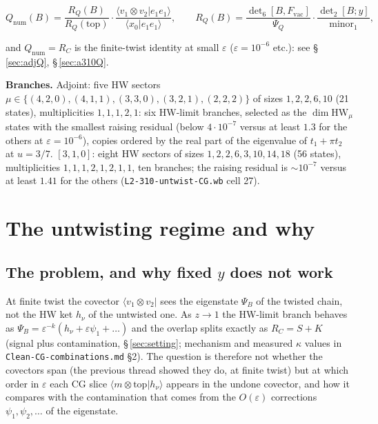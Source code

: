 \documentclass[10pt]{article}
\newcommand{\nb}[1]{\texttt{#1}}
\begin{document}
\[
Q_{\mathrm{num}}(B)=\frac{R_Q(B)}{R_Q(\mathrm{top})}\cdot\frac{\langle v_1\otimes v_2|e_1e_1\rangle}{\langle x_0|e_1e_1\rangle},\qquad R_Q(B)=\frac{\det\nolimits_6[B,F_{\mathrm{vac}}]}{\Psi_Q}\cdot\frac{\det\nolimits_2[B;y]}{\mathrm{minor}_1},
\]

and $Q_{\mathrm{num}}=R_C$ is the finite-twist identity at small $\varepsilon$ ($\varepsilon=10^{-6}$ etc.): see \S\,\ref{sec:adjQ}, \S\,\ref{sec:a310Q}.

\textbf{Branches.} Adjoint: five HW sectors $\mu\in\{(4,2,0),(4,1,1),(3,3,0),(3,2,1),(2,2,2)\}$ of sizes $1,2,2,6,10$ (21 states), multiplicities $1,1,1,2,1$: six HW-limit branches, selected as the $\dim\mathrm{HW}_\mu$ states with the smallest raising residual (below $4\cdot10^{-7}$ versus at least $1.3$ for the others at $\varepsilon=10^{-6}$), copies ordered by the real part of the eigenvalue of $t_1+\pi t_2$ at $u=3/7$. $[3,1,0]$: eight HW sectors of sizes $1,2,2,6,3,10,14,18$ (56 states), multiplicities $1,1,1,2,1,2,1,1$, ten branches; the raising residual is $\sim10^{-7}$ versus at least $1.41$ for the others (\nb{L2-\allowbreak{}310-\allowbreak{}untwist-\allowbreak{}CG.\allowbreak{}wb} cell 27).

\section{The untwisting regime and why}\label{sec:regime}

\subsection{The problem, and why fixed $y$ does not work}\label{sec:fixedy}

At finite twist the covector $\langle v_1\otimes v_2|$ sees the eigenstate $\Psi_B$ of the twisted chain, not the HW ket $h_\nu$ of the untwisted one. As $z\to1$ the HW-limit branch behaves as $\Psi_B=\varepsilon^{-k}(h_\nu+\varepsilon\psi_1+\dots)$ and the overlap splits exactly as $R_C=S+K$ (signal plus contamination, \S\,\ref{sec:setting}; mechanism and measured $\kappa$ values in \nb{Clean-\allowbreak{}CG-\allowbreak{}combinations.\allowbreak{}md} \S{}2). The question is therefore not whether the covectors span (the previous thread showed they do, at finite twist) but at which order in $\varepsilon$ each CG slice $\langle m\otimes\mathrm{top}|h_\nu\rangle$ appears in the undone covector, and how it compares with the contamination that comes from the $O(\varepsilon)$ corrections $\psi_1,\psi_2,\dots$ of the eigenstate.
\end{document}

